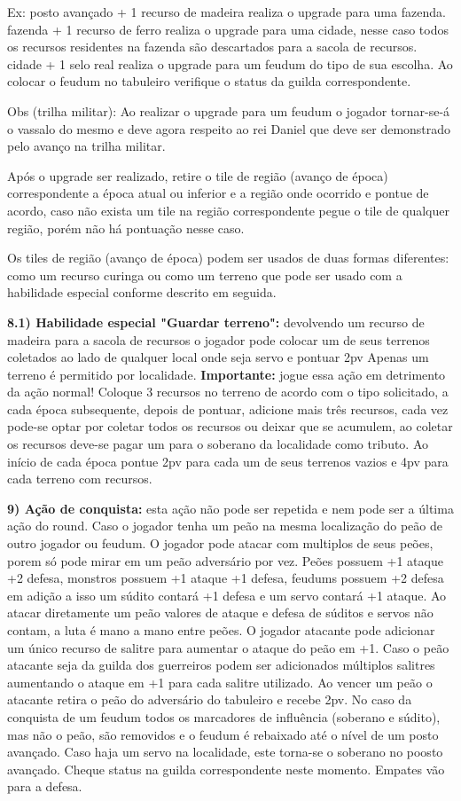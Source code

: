 \documentclass[11pt]{article}
\begin{document}
Ex:
posto avançado + 1 recurso de madeira realiza o upgrade para uma fazenda.
fazenda + 1 recurso de ferro realiza o upgrade para uma cidade, nesse caso todos os recursos residentes na fazenda são descartados para a sacola de recursos.
cidade + 1 selo real realiza o upgrade para um feudum do tipo de sua escolha. Ao colocar o feudum no tabuleiro verifique o status da guilda correspondente.

Obs (trilha militar): Ao realizar o upgrade para um feudum o jogador tornar-se-á o vassalo do mesmo e deve agora respeito ao rei Daniel que deve ser demonstrado pelo avanço na trilha militar.

Após o upgrade ser realizado, retire o tile de região (avanço de época) correspondente a época atual ou inferior e a região onde ocorrido e pontue de acordo, caso não exista um tile na região correspondente pegue o tile de qualquer região,
porém não há pontuação nesse caso.

Os tiles de região (avanço de época) podem ser usados de duas formas diferentes: como um recurso curinga ou como um terreno que pode ser usado com a habilidade especial conforme descrito em seguida.

\textbf{8.1) Habilidade especial "Guardar terreno":} devolvendo um recurso de madeira para a sacola de recursos o jogador pode colocar um de seus terrenos coletados ao lado de qualquer local onde seja servo e pontuar 2pv
Apenas um terreno é permitido por localidade. \textbf{Importante:} jogue essa ação em detrimento da ação normal!
Coloque 3 recursos no terreno de acordo com o tipo solicitado, a cada época subsequente, depois de pontuar, adicione mais três recursos, cada vez pode-se optar por coletar todos os recursos ou deixar que se acumulem,
ao coletar os recursos deve-se pagar um para o soberano da localidade como tributo. Ao início de cada época pontue 2pv para cada um de seus terrenos vazios e 4pv para cada terreno com recursos.

\textbf{9) Ação de conquista:} esta ação não pode ser repetida e nem pode ser a última ação do round. Caso o jogador tenha um peão na mesma localização do peão de outro jogador ou feudum. O jogador pode atacar com multiplos de
seus peões, porem só pode mirar em um peão adversário por vez.
Peões possuem +1 ataque +2 defesa, monstros possuem +1 ataque +1 defesa, feudums possuem +2 defesa em adição a isso um súdito contará +1 defesa e um servo contará +1 ataque. Ao atacar diretamente um peão valores de ataque e
defesa de súditos e servos não contam, a luta é mano a mano entre peões. O jogador atacante pode adicionar um único recurso de salitre para aumentar o ataque do peão em +1. Caso o peão atacante seja da guilda dos guerreiros
podem ser adicionados múltiplos salitres aumentando o ataque em +1 para cada salitre utilizado.
Ao vencer um peão o atacante retira o peão do adversário do tabuleiro e recebe 2pv. No caso da conquista de um feudum todos os marcadores de influência (soberano e súdito), mas não o peão, são removidos e o feudum é rebaixado
até o nível de um posto avançado. Caso haja um servo na localidade, este torna-se o soberano no poosto avançado. Cheque status na guilda correspondente neste momento.
Empates vão para a defesa.
\end{document}

